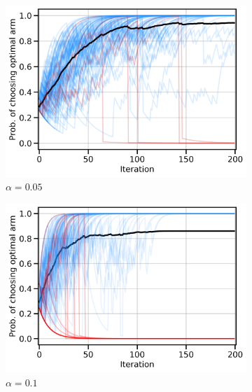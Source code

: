\begin{figure}[t!]
\centering
\begin{subfigure}[b]{0.32\linewidth}   
    \includegraphics[width=\textwidth]{articles/baselines/figs/paper/bandit_committal_005.png}
    \caption{$\alpha=0.05$}
\end{subfigure}
\begin{subfigure}[b]{0.32\linewidth}   
    \includegraphics[width=\textwidth]{articles/baselines/figs/paper/bandit_committal.png}
    \caption{$\alpha=0.1$}
\end{subfigure}
\begin{subfigure}[b]{0.32\linewidth}   

\end{subfigure}
\end{figure}
